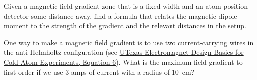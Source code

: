 \begin{exercise}
Given a magnetic field gradient zone that is a fixed width and an atom position detector some distance away, find a formula that relates the magnetic dipole moment to the strength of the gradient and the relevant distances in the setup.

\end{exercise}

\begin{exercise}
One way to make a magnetic field gradient is to use two current-carrying wires in the anti-Helmholtz configuration (see \href{http://george.ph.utexas.edu/~meyrath/informal/electromagnets.pdf} {UTexas Electromagnet Design Basics
for Cold Atom Experiments, Equation 6}). What is the maximum field gradient to first-order if we use 3 amps of current with a radius of 10~cm?

\end{exercise}

